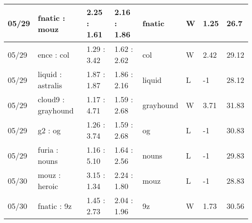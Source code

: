 \begin{small}
\begin{longtable}{|l|l|l|l|l|l|l|l|}
	05/29                               & fnatic : mouz                       & 2.25 : 1.61                             & 2.16 : 1.86                             & fnatic                            & W                                 & 1.25                                 & 26.7                              \\ \hline
	05/29                               & ence : col                          & 1.29 : 3.42                             & 1.62 : 2.62                             & col                               & W                                 & 2.42                                 & 29.12                             \\ \hline
	05/29                               & liquid : astralis                   & 1.87 : 1.87                             & 1.86 : 2.16                             & liquid                            & L                                 & -1                                   & 28.12                             \\ \hline
	05/29                               & cloud9 : grayhound                  & 1.17 : 4.71                             & 1.59 : 2.68                             & grayhound                         & W                                 & 3.71                                 & 31.83                             \\ \hline
	05/29                               & g2 : og                             & 1.26 : 3.74                             & 1.59 : 2.68                             & og                                & L                                 & -1                                   & 30.83                             \\ \hline
	05/29                               & furia : nouns                       & 1.16 : 5.10                             & 1.64 : 2.56                             & nouns                             & L                                 & -1                                   & 29.83                             \\ \hline
	05/30                               & mouz : heroic                       & 3.15 : 1.34                             & 2.24 : 1.80                             & mouz                              & L                                 & -1                                   & 28.83                             \\ \hline
	05/30                               & fnatic : 9z                         & 1.45 : 2.73                             & 2.04 : 1.96                             & 9z                                & W                                 & 1.73                                 & 30.56                             \\ \hline

\end{longtable}
\end{small}
